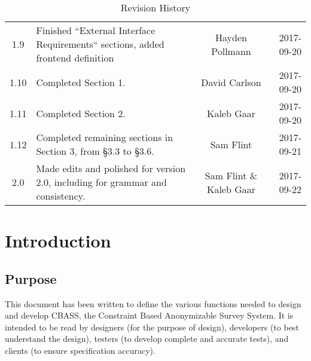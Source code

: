 \documentclass[10pt,letter]{report}
\begin{document}
\begin{table}[h]
\begin{tabularx}{\textwidth}{c|X|c|r}
    1.9                & Finished ``External Interface Requirements`` sections, added frontend definition                           & Hayden Pollmann         & 2017-09-20    \\
    1.10               & Completed Section 1.                                                                                       & David Carlson           & 2017-09-20    \\
    1.11               & Completed Section 2.                                                                                       & Kaleb Gaar              & 2017-09-20    \\
    1.12               & Completed remaining sections in Section 3, from \S 3.3 to \S 3.6.                                          & Sam Flint               & 2017-09-21    \\
    2.0                & Made edits and polished for version 2.0, including for grammar and consistency.                            & Sam Flint \& Kaleb Gaar & 2017-09-22    \\
    \hline
  \end{tabularx}
  \caption{Revision History}
  \label{tab:rev-hist}
\end{table}
\newpage

\hypersetup{linkcolor=black}
\tableofcontents
\hypersetup{linkcolor=red}
\newpage



\chapter{Introduction}
\label{cha:introduction}

\section{Purpose}
\label{sec:purpose}

This document has been written to define the various functions needed
to design and develop CBASS, the Constraint Based Anonymizable Survey
System.  It is intended to be read by designers (for the purpose of
design), developers (to best understand the design), testers (to
develop complete and accurate tests), and clients (to ensure
specification accuracy).
\end{document}
